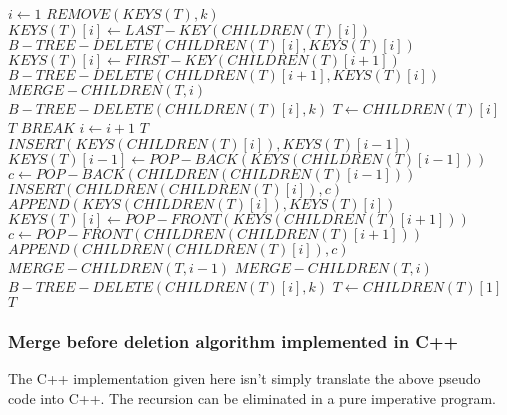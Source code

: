 \documentclass{article}
\begin{document}
\begin{algorithmic}[1]
  \State $i \leftarrow 1$
       
        \State $REMOVE(KEYS(T), k)$
      \Else {}
         
          \State $KEYS(T)[i] \leftarrow LAST-KEY(CHILDREN(T)[i])$
          \State $B-TREE-DELETE(CHILDREN(T)[i], KEYS(T)[i])$
         
          \State $KEYS(T)[i] \leftarrow FIRST-KEY(CHILDREN(T)[i+1])$
          \State $B-TREE-DELETE(CHILDREN(T)[i+1], KEYS(T)[i])$
        \Else {}
          \State $MERGE-CHILDREN(T, i)$
          \State $B-TREE-DELETE(CHILDREN(T)[i], k)$
            \State $T \leftarrow CHILDREN(T)[i]$ 
          \EndIf
        \EndIf
      \EndIf
      \State \Return $T$
      \State $BREAK$
    \Else
      \State $i \leftarrow i+1$
    \EndIf
  \EndWhile
  \Statex
    \State \Return $T$ 
  \EndIf
    
     
      \State $INSERT(KEYS(CHILDREN(T)[i]), KEYS(T)[i-1])$
      \State $KEYS(T)[i-1] \leftarrow POP-BACK(KEYS(CHILDREN(T)[i-1]))$
        \State $c \leftarrow POP-BACK(CHILDREN(CHILDREN(T)[i-1]))$
        \State $INSERT(CHILDREN(CHILDREN(T)[i]), c)$
      \EndIf
     
      \State $APPEND(KEYS(CHILDREN(T)[i]), KEYS(T)[i])$
      \State $KEYS(T)[i] \leftarrow POP-FRONT(KEYS(CHILDREN(T)[i+1]))$
        \State $c \leftarrow POP-FRONT(CHILDREN(CHILDREN(T)[i+1]))$
        \State $APPEND(CHILDREN(CHILDREN(T)[i]), c)$
      \EndIf
    \Else {}
        \State $MERGE-CHILDREN(T, i-1)$
      \Else
        \State $MERGE-CHILDREN(T, i)$
      \EndIf
    \EndIf
  \EndIf
  \State $B-TREE-DELETE(CHILDREN(T)[i], k)$ 
   
    \State $T \gets CHILDREN(T)[1]$
  \EndIf
  \State \Return $T$
\EndFunction
\end{algorithmic}

\subsubsection{Merge before deletion algorithm implemented in C++}
The C++ implementation given here isn't simply translate the above
pseudo code into C++. The recursion can be eliminated in a pure
imperative program.
\end{document}

